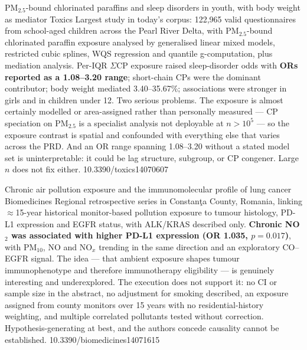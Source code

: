 \documentclass[10pt]{article}
\begin{document}

{PM$_{2.5}$-bound chlorinated paraffins and sleep disorders in youth, with body weight as mediator}
{Toxics}
{Largest study in today's corpus: 122{,}965 valid questionnaires from school-aged children
across the Pearl River Delta, with PM$_{2.5}$-bound chlorinated paraffin exposure analysed
by generalised linear mixed models, restricted cubic splines, WQS regression and quantile
g-computation, plus mediation analysis. Per-IQR $\Sigma$CP exposure raised sleep-disorder
odds with \textbf{ORs reported as a 1.08--3.20 range}; short-chain CPs were the dominant
contributor; body weight mediated 3.40--35.67\%; associations were stronger in girls and
in children under 12. Two serious problems. The exposure is almost certainly modelled or
area-assigned rather than personally measured --- CP speciation on PM$_{2.5}$ is a
specialist analysis not deployable at $n>10^5$ --- so the exposure contrast is spatial and
confounded with everything else that varies across the PRD. And an OR range spanning
1.08--3.20 without a stated model set is uninterpretable: it could be lag structure,
subgroup, or CP congener. Large $n$ does not fix either.}
{10.3390/toxics14070607}

{Chronic air pollution exposure and the immunomolecular profile of lung cancer}
{Biomedicines}
{Regional retrospective series in Constan\c{t}a County, Romania, linking $\approx$15-year
historical monitor-based pollution exposure to tumour histology, PD-L1 expression and EGFR
status, with ALK/KRAS described only. \textbf{Chronic NO$_2$ was associated with higher
PD-L1 expression (OR 1.035, $p=0.017$)}, with PM$_{10}$, NO and NO$_x$ trending in the
same direction and an exploratory CO--EGFR signal. The idea --- that ambient exposure shapes
tumour immunophenotype and therefore immunotherapy eligibility --- is genuinely interesting
and underexplored. The execution does not support it: no CI or sample size in the
abstract, no adjustment for smoking described, an exposure assigned from county monitors
over 15 years with no residential-history weighting, and multiple correlated pollutants
tested without correction. Hypothesis-generating at best, and the authors concede
causality cannot be established.}
{10.3390/biomedicines14071615}
\end{document}

